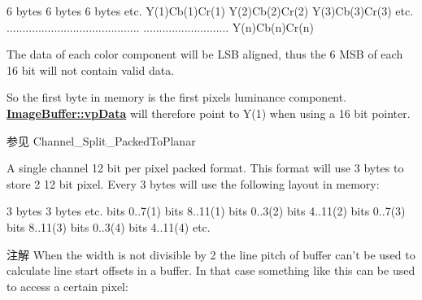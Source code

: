 \begin{Desc}
\begin{description}
\begin{DoxyCode}
6 bytes        6 bytes        6 bytes      etc.
Y(1)Cb(1)Cr(1) Y(2)Cb(2)Cr(2) Y(3)Cb(3)Cr(3) etc.
..........................................
...........................   Y(n)Cb(n)Cr(n)
\end{DoxyCode}


The data of each color component will be L\+S\+B aligned, thus the 6 M\+S\+B of each 16 bit will not contain valid data.

So the first byte in memory is the first pixels luminance component. {\bfseries \hyperlink{struct_image_buffer_ab67c9c21d749e786302c848b508e0673}{Image\+Buffer\+::vp\+Data}} will therefore point to Y(1) when using a 16 bit pointer.

\begin{DoxySeeAlso}{参见}
Channel\+\_\+\+Split\+\_\+\+Packed\+To\+Planar 
\end{DoxySeeAlso}
\item[{\em 
\hypertarget{group___common_interface_gga456e8aa76e06bb761f27c52141475985a47795e3b914b97fcda4afd6a0e038fca}{ibpf\+Mono12\+Packed\+\_\+\+V1}\label{group___common_interface_gga456e8aa76e06bb761f27c52141475985a47795e3b914b97fcda4afd6a0e038fca}
}]A single channel 12 bit per pixel packed format. This format will use 3 bytes to store 2 12 bit pixel. Every 3 bytes will use the following layout in memory\+:


\begin{DoxyCode}
3 bytes                                               3 bytes                                              
       etc.
bits 0..7(1) bits 8..11(1) bits 0..3(2) bits 4..11(2) bits 0..7(3) bits 8..11(3) bits 0..3(4) bits 4..11(4)
       etc.
\end{DoxyCode}


\begin{DoxyNote}{注解}
When the width is not divisible by 2 the line pitch of buffer can't be used to calculate line start offsets in a buffer. In that case something like this can be used to access a certain pixel\+:
\end{DoxyNote}


\end{description}
\end{Desc}
